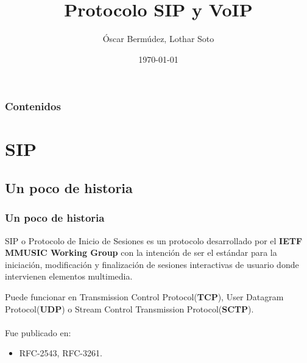 \documentclass{beamer}
\title[Protocolo SIP y VoIP]{Protocolo SIP y VoIP} %
\author{Óscar Bermúdez, Lothar Soto} %
\institute[UGR] %
{
  Universidad de Granada \\ %
  \medskip
  \textit{lsotpal@correo.ugr.es\\
  oscarbg@correo.ugr.es} %
}
\date{\today} %
\begin{document}
\begin{frame}
\titlepage %
\end{frame}

\begin{frame}
  \frametitle{Contenidos} %
  \tableofcontents
\end{frame}




\section{SIP} %

\subsection{Un poco de historia} %
\begin{frame}
\frametitle{Un poco de historia}
SIP o Protocolo de Inicio de Sesiones es un protocolo desarrollado por el \textbf{IETF MMUSIC Working Group} con la intención de ser el estándar para la iniciación, modificación y finalización de sesiones interactivas de usuario donde intervienen elementos multimedia.
	
	Puede funcionar en Transmission Control Protocol(\textbf{TCP}), User Datagram Protocol(\textbf{UDP}) o Stream Control Transmission Protocol(\textbf{SCTP}).\\~\\
	Fue publicado en:
	\begin{itemize}
	\item RFC-2543, RFC-3261.
	\end{itemize}
\end{frame}
\end{document}
